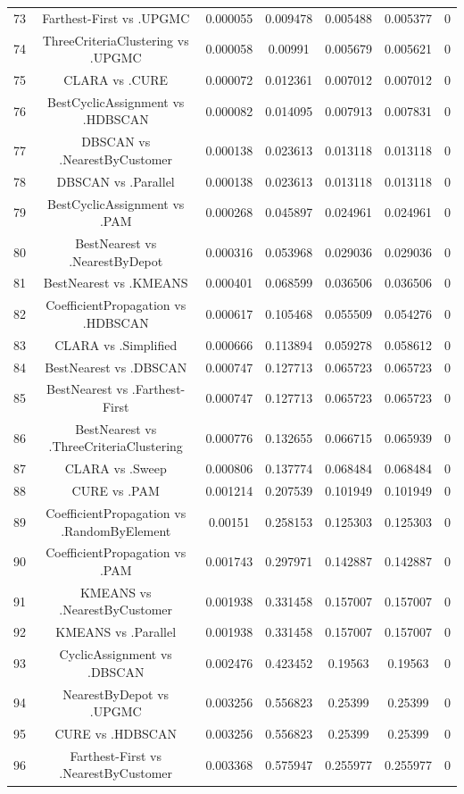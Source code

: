 \documentclass[a4paper,10pt]{article}
\begin{document}
\begin{landscape}
\begin{table}[!htp]
\begin{tabular}{ccccccc}
73&Farthest-First vs .UPGMC&0.000055&0.009478&0.005488&0.005377&0\\
74&ThreeCriteriaClustering vs .UPGMC&0.000058&0.00991&0.005679&0.005621&0\\
75&CLARA vs .CURE&0.000072&0.012361&0.007012&0.007012&0\\
76&BestCyclicAssignment vs .HDBSCAN&0.000082&0.014095&0.007913&0.007831&0\\
77&DBSCAN vs .NearestByCustomer&0.000138&0.023613&0.013118&0.013118&0\\
78&DBSCAN vs .Parallel&0.000138&0.023613&0.013118&0.013118&0\\
79&BestCyclicAssignment vs .PAM&0.000268&0.045897&0.024961&0.024961&0\\
80&BestNearest vs .NearestByDepot&0.000316&0.053968&0.029036&0.029036&0\\
81&BestNearest vs .KMEANS&0.000401&0.068599&0.036506&0.036506&0\\
82&CoefficientPropagation vs .HDBSCAN&0.000617&0.105468&0.055509&0.054276&0\\
83&CLARA vs .Simplified&0.000666&0.113894&0.059278&0.058612&0\\
84&BestNearest vs .DBSCAN&0.000747&0.127713&0.065723&0.065723&0\\
85&BestNearest vs .Farthest-First&0.000747&0.127713&0.065723&0.065723&0\\
86&BestNearest vs .ThreeCriteriaClustering&0.000776&0.132655&0.066715&0.065939&0\\
87&CLARA vs .Sweep&0.000806&0.137774&0.068484&0.068484&0\\
88&CURE vs .PAM&0.001214&0.207539&0.101949&0.101949&0\\
89&CoefficientPropagation vs .RandomByElement&0.00151&0.258153&0.125303&0.125303&0\\
90&CoefficientPropagation vs .PAM&0.001743&0.297971&0.142887&0.142887&0\\
91&KMEANS vs .NearestByCustomer&0.001938&0.331458&0.157007&0.157007&0\\
92&KMEANS vs .Parallel&0.001938&0.331458&0.157007&0.157007&0\\
93&CyclicAssignment vs .DBSCAN&0.002476&0.423452&0.19563&0.19563&0\\
94&NearestByDepot vs .UPGMC&0.003256&0.556823&0.25399&0.25399&0\\
95&CURE vs .HDBSCAN&0.003256&0.556823&0.25399&0.25399&0\\
96&Farthest-First vs .NearestByCustomer&0.003368&0.575947&0.255977&0.255977&0\\

\end{tabular}
\end{table}
\end{landscape}
\end{document}
